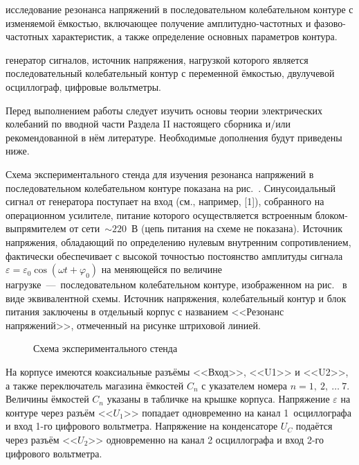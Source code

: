 
\begin{lab:aim}
     исследование резонанса напряжений в последовательном колебательном контуре
с изменяемой ёмкостью, включающее получение амплитудно-частотных и
фазово-частотных характеристик, а также определение основных параметров контура.
\end{lab:aim}

\begin{lab:equipment}
	генератор сигналов, источник напряжения, нагрузкой которого является
последовательный колебательный контур с переменной ёмкостью, двулучевой
осциллограф, цифровые вольтметры.
\end{lab:equipment}

Перед выполнением работы следует изучить основы теории электрических  колебаний
по вводной части Раздела II настоящего сборника и/или рекомендованной в нём
литературе. Необходимые дополнения будут приведены ниже.

\experiment
Схема экспериментального стенда для изучения резонанса напряжений в
последовательном колебательном контуре показана на рис.~.
Синусоидальный сигнал от генератора поступает на вход  (см., например, [1]), собранного на
операционном усилителе, питание которого осуществляется встроенным
блоком-выпрямителем от сети~$\sim220$~В (цепь питания на схеме не показана).
Источник напряжения, обладающий по определению нулевым внутренним
сопротивлением, фактически обеспечивает с высокой точностью постоянство
амплитуды сигнала~$\varepsilon=\varepsilon_0\cos(\omega t+\varphi_0)$ на
меняющейся по величине нагрузке~---~последовательном колебательном контуре,
изображенном на рис.~ в виде эквивалентной схемы. Источник
напряжения, колебательный контур и блок питания заключены в отдельный корпус с
названием <<Резонанс напряжений>>, отмеченный на рисунке штриховой линией.
\begin{figure}[h!]
	\caption{Схема экспериментального стенда}
\end{figure}
На корпусе имеются коаксиальные разъёмы <<Вход>>, <<U1>> и <<U2>>, а также
переключатель магазина ёмкостей $C_n$ с указателем номера $n=1,~2,~\ldots~7.$
Величины ёмкостей $C_n$ указаны в табличке на крышке корпуса. Напряжение
$\varepsilon$ на контуре через разъём <<$U_1$>> попадает одновременно на канал
1~осциллографа и вход 1-го цифрового вольтметра. Напряжение на конденсаторе
$U_C$ подаётся через разъём <<$U_2$>> одновременно на канал 2 осциллографа и
вход 2-го цифрового вольтметра.

